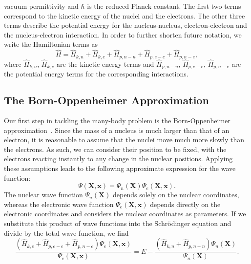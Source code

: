 \begin{refsection}
vacuum permittivity and $\hbar$ is the reduced Planck constant. The first two 
terms correspond to the kinetic energy of the nuclei and the electrons. The 
other three terms describe the potential energy for the nucleus-nucleus, 
electron-electron and the nucleus-electron interaction. In order to further 
shorten future notation, we write the Hamiltonian terms as 
\begin{equation} 
\hat{H} = \hat{H}_{k,n} + \hat{H}_{k,e} + \hat{H}_{p,n-n} + \hat{H}_{p,e-e} + 
\hat{H}_{p,n-e}, 
\end{equation} 
where $\hat{H}_{k,n}$, $\hat{H}_{k,e}$ are the kinetic energy terms and 
$\hat{H}_{p,n-n}$, $\hat{H}_{p,e-e}$, $\hat{H}_{p,n-e}$ are the potential 
energy terms for the corresponding interactions. 
 
\subsection{The Born-Oppenheimer Approximation} 
 
Our first step in tackling the many-body problem is the Born-Oppenheimer 
approximation~\cite{Born1927}. Since the mass of a nucleus is much larger than 
that of an electron, it is reasonable to assume that the nuclei move much more 
slowly than the electrons. As such, we can consider their position to be 
fixed, with the electrons reacting instantly to any change in the nuclear 
positions. Applying these assumptions leads to the following approximate 
expression for the wave function: 
\begin{equation} 
\Psi (\mathbf{X}, \mathbf{x}) = \Psi_n (\mathbf{X}) \Psi_e (\mathbf{X}, 
\mathbf{x}). 
\end{equation} 
The nuclear wave function $ \Psi_n (\mathbf{X})$ depends solely on the nuclear 
coordinates, whereas the electronic wave function $\Psi_e 
(\mathbf{X},\mathbf{x})$ depends directly on the electronic coordinates and 
considers the nuclear coordinates as parameters. If we substitute this product 
of wave functions into the Schr\"odinger equation and divide by the total wave 
function, we find 
\begin{equation} 
\frac{(\hat{H}_{k,e} + \hat{H}_{p,e-e} + \hat{H}_{p,n-e})\Psi_e(\mathbf{X}, 
\mathbf{x})}{\Psi_e(\mathbf{X}, \mathbf{x})} = E - \frac{(\hat{H}_{k,n} + 
\hat{H}_{p,n-n})\Psi_n (\mathbf{X})}{\Psi_n (\mathbf{X}) }. 
\end{equation} 
 

\end{refsection}
